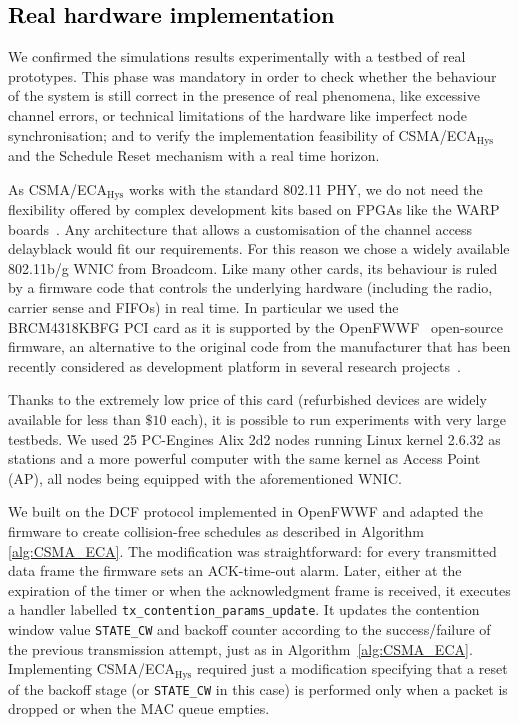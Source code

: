 \textcolor{black}{\section{Real hardware implementation}\label{EDCA}}

We confirmed the simulations results experimentally with a testbed of real prototypes. This phase was mandatory in order to check whether the behaviour of the system is still correct in the presence of real phenomena, like excessive channel errors, or technical limitations of the hardware like imperfect node synchronisation; and to verify the implementation feasibility of CSMA/ECA$_{\text{Hys}}$ and the Schedule Reset mechanism with a real time horizon.

As CSMA/ECA$_{\text{Hys}}$ works with the standard 802.11 PHY, we do not need the flexibility offered by complex development kits based on FPGAs like the WARP boards~\cite{amiri2007warp}. Any architecture that allows a customisation of the channel access delay{black} would fit our requirements. For this reason we chose a widely available 802.11b/g WNIC from Broadcom. Like many other cards, its behaviour is ruled by a firmware code that controls the underlying hardware (including the radio, carrier sense and FIFOs) in real time. In particular we used the BRCM4318KBFG PCI card as it is supported by the OpenFWWF~\cite{OpenFWWF} open-source firmware, an alternative to the original code from the manufacturer that has been recently considered as development platform in several research projects~\cite{WMP,gringolitmc14,gringoliccr14,berger14,CF-MAC}. 

Thanks to the extremely low price of this card (refurbished devices are widely available for less than $\$10$ each), it is possible to run experiments with very large testbeds. We used 25 PC-Engines Alix 2d2 nodes running Linux kernel 2.6.32 as stations and a more powerful computer with the same kernel as Access Point (AP), all nodes being equipped with the aforementioned WNIC.

We built on the DCF protocol implemented in OpenFWWF and adapted the firmware to create collision-free schedules as described in Algorithm \ref{alg:CSMA_ECA}. The modification was straightforward: for every transmitted data frame the firmware sets an ACK-time-out alarm. Later, either at the expiration of the timer or when the acknowledgment frame is received, it executes a handler labelled {\tt tx\_contention\_params\_update}. It updates the contention window value {\tt STATE\_CW} and backoff counter according to the success/failure of the previous transmission attempt, just as in Algorithm~\ref{alg:CSMA_ECA}. Implementing CSMA/ECA$_{\text{Hys}}$ required just a modification specifying that a reset of the backoff stage (or {\tt STATE\_CW} in this case) is performed only when a packet is dropped or when the MAC queue empties.

